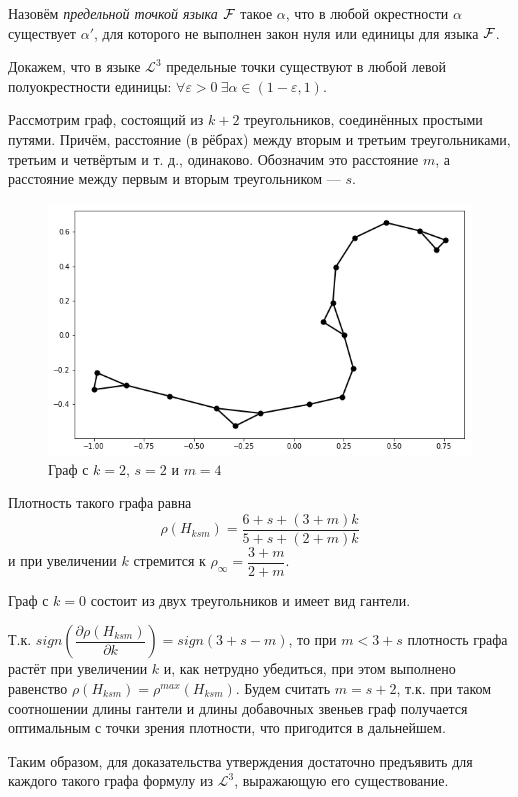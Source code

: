 \Def Назовём \textit{предельной точкой языка $\mathcal{F}$} такое $\alpha$, что в любой окрестности $\alpha$ существует $\alpha'$, для которого не выполнен закон нуля или единицы для языка $\mathcal{F}$.

Докажем, что в языке $\mathcal{L}^3$ предельные точки существуют в любой левой полуокрестности единицы: 
$\forall \varepsilon > 0 ~ \exists \alpha \in (1 - \varepsilon, 1)$.

Рассмотрим граф, состоящий из $k+2$ треугольников, соединённых простыми путями.
Причём, расстояние (в рёбрах) между вторым и третьим треугольниками, третьим и четвёртым и т. д., одинаково.
Обозначим это расстояние $m$, а расстояние между первым и вторым треугольником --- $s$.

\begin{figure}[h]
    \centering
  \includegraphics[scale=0.4]{picrel/index.png}
  \caption{Граф с $k = 2$, $s = 2$ и $m = 4$}
  \label{fig:chain1}
\end{figure}

Плотность такого графа равна 
$$\rho({H_{ksm}}) = \dfrac{6+s + (3+m)k}{5+s + (2+m)k}$$
и при увеличении $k$ стремится к $\rho_\infty = \dfrac{3+m}{2+m}$.

Граф с $k=0$ состоит из двух треугольников и имеет вид гантели.

Т.к. 
$sign\left(\dfrac{\partial\rho({H_{ksm}})}{\partial k}\right) = sign(3+s-m)$,
то при $m < 3 + s$ плотность графа растёт при увеличении  $k$ и, как нетрудно убедиться, при этом выполнено равенство
$\rho({H_{ksm}}) = \rho^{max}({H_{ksm}})$.
Будем считать $m = s+2$, т.к. при таком соотношении длины гантели и длины добавочных звеньев
граф получается оптимальным с точки зрения плотности, что пригодится в дальнейшем.

Таким образом, для доказательства утверждения достаточно предъявить для каждого такого графа формулу из  $\mathcal{L}^3$, выражающую его существование.

